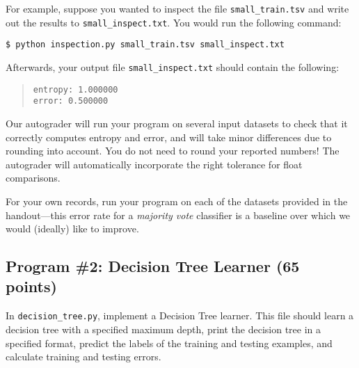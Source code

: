 For example, suppose you wanted to inspect the file \lstinline{small_train.tsv} and write out the results to \lstinline{small_inspect.txt}. You would run the following command:
%
\begin{lstlisting}[language=Shell]
$ python inspection.py small_train.tsv small_inspect.txt
\end{lstlisting}
%
Afterwards, your output file \lstinline{small_inspect.txt} should contain the following:
%
\begin{quote}
\begin{verbatim}
entropy: 1.000000
error: 0.500000
\end{verbatim}
\end{quote}
%
Our autograder will run your program on several input datasets to check that it correctly computes entropy and error, and will take minor differences due to rounding into account. You do not need to round your reported numbers! The autograder will automatically incorporate the right tolerance for float comparisons.

\begin{notebox}
For your own records, run your program on each of the datasets provided in the handout---this error rate for a \emph{majority vote} classifier is a baseline over which we would (ideally) like to improve.
\end{notebox}

\subsection{Program \#2: Decision Tree Learner (65 points)}
\label{sec:decisiontree}

In \texttt{decision\_tree.py}, implement a Decision Tree learner. This file should learn a decision tree with a specified maximum depth, print the decision tree in a specified format, predict the labels of the training and testing examples, and calculate training and testing errors.

